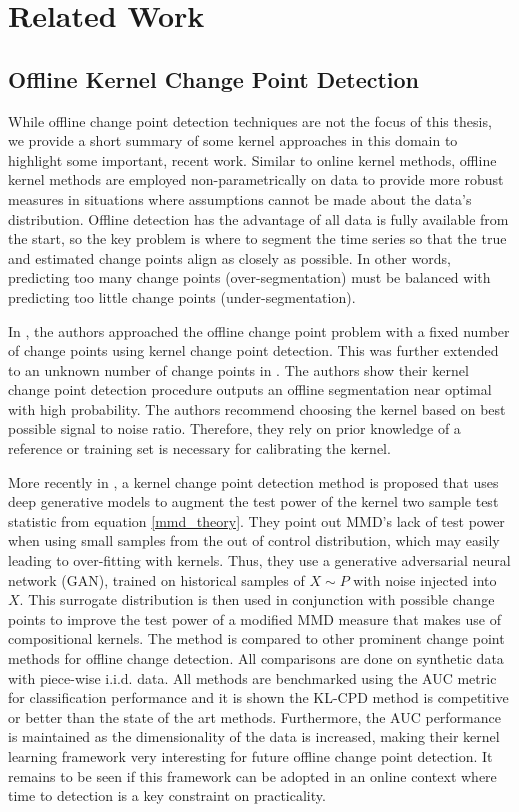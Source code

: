 \section{Related Work}
\label{related_works}

\subsection{Offline Kernel Change Point Detection}
While offline change point detection techniques are not the focus of this thesis, we provide a short summary of some kernel approaches in this domain to highlight some important, recent work.  Similar to online kernel methods, offline kernel methods are employed non-parametrically on data to provide more robust measures in situations where assumptions cannot be made about the data's distribution. Offline detection has the advantage of all data is fully available from the start, so the key problem is where to segment the time series so that the true and estimated change points align as closely as possible.  In other words, predicting too many change points (over-segmentation) must be balanced with predicting too little change points (under-segmentation). 

In \cite{harchaoui2007retrospective}, the authors approached the offline change point problem with a fixed number of change points using kernel change point detection. This was further extended to an unknown number of change points in \cite{arlot2012kernel}. The authors show their kernel change point detection procedure outputs an offline segmentation near optimal with high probability. The authors recommend choosing the kernel based on best possible signal to noise ratio. Therefore, they rely on prior knowledge of a reference or training set is necessary for calibrating the kernel. 

More recently in \cite{chang2019kernel}, a  kernel change point detection method is proposed that uses deep generative models to augment the test power of the kernel two sample test statistic from equation \ref{mmd_theory}. They point out MMD's lack of test power when using small samples from the out of control distribution, which may easily leading to over-fitting with kernels. Thus, they use a generative adversarial neural network (GAN), trained on historical samples of $X \sim  P$  with noise injected into $X$. This surrogate distribution is then used in conjunction with possible change points to improve the test power of a modified MMD measure that makes use of compositional kernels. The method is compared to other prominent change point methods for offline change detection. All comparisons are done on synthetic data with piece-wise i.i.d. data. All methods are benchmarked using the AUC metric for classification performance and it is shown the KL-CPD method is competitive or better than the state of the art methods.  Furthermore, the AUC performance is maintained as the dimensionality of the data is increased, making their kernel learning framework very interesting for future offline change point detection. It remains to be seen if this framework can be adopted in an online context where time to detection is a key constraint on practicality.

